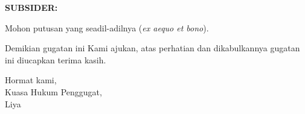 \documentclass[12pt,a4paper]{article}
\begin{document}
\textbf{SUBSIDER:}

Mohon putusan yang seadil-adilnya (\emph{ex aequo et bono}).

Demikian gugatan ini Kami ajukan, atas perhatian dan dikabulkannya gugatan ini diucapkan terima kasih.


\vspace{1cm}

\begin{flushright}
    Hormat kami,\\
    Kuasa Hukum Penggugat,\\[1.5cm]
    Liya
\end{flushright}
\end{document}
